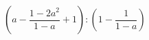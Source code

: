\begin{ex}[type=expression]
	\begin{condition}
		\( \left( a-\dfrac{1-2a^2}{1-a}+1 \right):\left( 1-\dfrac{1}{1-a} \right) \)
	\end{condition}
\end{ex}